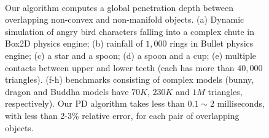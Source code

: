 \begin{figure}
{  \\
}
\caption[Learning-based PD computation algorithm computes a global penetration depth between overlapping non-convex and non-manifold objects]{Our algorithm computes a global penetration depth between overlapping non-convex and non-manifold objects. (a) Dynamic simulation of angry bird characters falling into a complex chute in Box2D physics engine; (b) rainfall of $1,000$ rings in Bullet physics engine; (c) a star and a spoon; (d) a spoon and a cup; (e) multiple contacts between upper and lower teeth (each has more than $40,000$ triangles). (f-h) benchmarks consisting of complex models (bunny, dragon and Buddha models have $70K$, $230K$ and $1M$ triangles, respectively). Our PD algorithm takes less than $0.1\sim2$ milliseconds, with less than 2-3\% relative error, for each pair of overlapping objects.}\label{fig:2:demo}
\end{figure}


